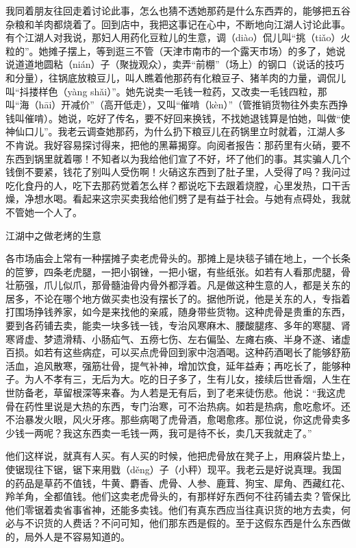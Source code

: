 \documentclass[12pt,UTF8]{ctexbook}
\begin{document}
我同着朋友往回走着讨论此事，怎么也猜不透她那药是什么东西弄的，能够把五谷杂粮和羊肉都烧着了。回到店中，我把这事记在心中，不断地向江湖人讨论此事。有个江湖人对我说，那妇人用药化豆粒儿的生意，调（diào）侃儿叫“挑（tiǎo）火粒的”。她摊子摆上，等到逛三不管（天津市南市的一个露天市场）的多了，她说说道道地圆粘（nián）子（聚拢观众），卖弄“前棚”（场上）的钢口（说话的技巧和分量），往锅底放粮豆儿，叫人瞧着他那药有化粮豆子、猪羊肉的力量，调侃儿叫“抖搂样色（yàng shǎi）”。她先说卖一毛钱一粒药，又改卖一毛钱四粒，那叫“海（hāi）开减价”（高开低走），又叫“催啃（kèn）”（管推销货物往外卖东西挣钱叫催啃）。她说，吃好了传名，要不好回来换钱，不找她退钱算是怕她，叫做“使神仙口儿”。我老云调查她那药，为什么扔下粮豆儿在药锅里立时就着，江湖人多不肯说。我好容易探讨得来，把他的黑幕揭穿。向阅者报告：那药里有火硝，要不东西到锅里就着哪！不知者以为我给他们宣了不好，坏了他们的事。其实骗人几个钱倒不要紧，钱花了别叫人受伤啊！火硝这东西到了肚子里，人受得了吗？我问过吃化食丹的人，吃下去那药觉着怎么样？都说吃下去跟着烧膛，心里发热，口干舌燥，净想水喝。看起来这宗买卖我给他们劈了是有益于社会。与她有点碍处，我就不管她一个人了。





江湖中之做老烤的生意


各市场庙会上常有一种摆摊子卖老虎骨头的。那摊上是块毯子铺在地上，一个长条的笸箩，四条老虎腿，一把小钢锉，一把小锯，有些纸张。如若有人看那虎腿，骨壮筋强，爪儿似爪，那骨髓油骨内骨外都浮着。凡是做这种生意的人，都是关东的居多，不论在哪个地方做买卖也没有摆长了的。据他所说，他是关东的人，专指着打围场挣钱养家，如今是来找他的亲戚，随身带些货物。这种虎骨是贵重的东西，要到各药铺去卖，能卖一块多钱一钱，专治风寒麻木、腰酸腿疼、多年的寒腿、肾寒肾虚、梦遗滑精、小肠疝气、五痨七伤、左右偏坠、左瘫右痪、半身不遂、诸虚百损。如若有这些病症，可以买点虎骨回到家中泡酒喝。这种药酒喝长了能够舒筋活血，追风散寒，强筋壮骨，提气补神，增加饮食，延年益寿；再吃长了，能够种子。为人不孝有三，无后为大。吃的日子多了，生有儿女，接续后世香烟，人生在世防备老，草留根深等来春。为人若是无有后，到了老来徒伤悲。他说：“我这虎骨在药性里说是大热的东西，专门治寒，可不治热病。如若是热病，愈吃愈坏。还不治暴发火眼，风火牙疼。那些病喝了虎骨酒，愈喝愈疼。那位说，你这虎骨卖多少钱一两呢？我这东西卖一毛钱一两，我可是待不长，卖几天我就走了。”

他们这样说，就真有人买。有人买的时候，他把虎骨放在凳子上，用麻袋片垫上，使锯现往下锯，锯下来用戥（děng）子（小秤）现平。我老云是好说真理。我国的药品是草药不值钱，牛黄、麝香、虎骨、人参、鹿茸、狗宝、犀角、西藏红花、羚羊角，全都值钱。他们这卖老虎骨头的，有那样好东西何不往药铺去卖？管保比他们零锯着卖省事省神，还能多卖钱。他们有真东西应当往真识货的地方去卖，何必与不识货的人费话？不问可知，他们那东西是假的。至于这假东西是什么东西做的，局外人是不容易知道的。
\end{document}
